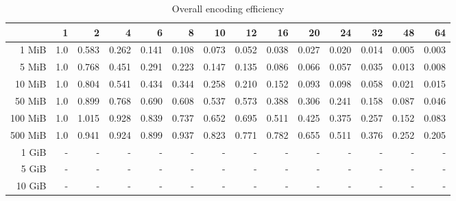 \begin{table}[!h]
	\centering
	\caption{Overall encoding efficiency}
	\begin{tabular}{rrrrrrrrrrrrrr}
		\toprule
		\diagbox[width=7em]{Size}{Processes} & 1 & 2 & 4 & 6 & 8 & 10 & 12 & 16 & 20 & 24 & 32 & 48 & 64 \\
        \midrule
        1 MiB   &  1.0 &  0.583 &  0.262 &  0.141 &  0.108 &  0.073 &  0.052 &  0.038 &  0.027 &  0.020 &  0.014 &  0.005 &  0.003 \\
        5 MiB   &  1.0 &  0.768 &  0.451 &  0.291 &  0.223 &  0.147 &  0.135 &  0.086 &  0.066 &  0.057 &  0.035 &  0.013 &  0.008 \\
        10 MiB  &  1.0 &  0.804 &  0.541 &  0.434 &  0.344 &  0.258 &  0.210 &  0.152 &  0.093 &  0.098 &  0.058 &  0.021 &  0.015 \\
        50 MiB  &  1.0 &  0.899 &  0.768 &  0.690 &  0.608 &  0.537 &  0.573 &  0.388 &  0.306 &  0.241 &  0.158 &  0.087 &  0.046 \\
        100 MiB &  1.0 &  1.015 &  0.928 &  0.839 &  0.737 &  0.652 &  0.695 &  0.511 &  0.425 &  0.375 &  0.257 &  0.152 &  0.083 \\
        500 MiB &  1.0 &  0.941 &  0.924 &  0.899 &  0.937 &  0.823 &  0.771 &  0.782 &  0.655 &  0.511 &  0.376 &  0.252 &  0.205 \\
        1 GiB & - & - & - & - & - & - & - & - & - & - & - & - & - \\
        5 GiB & - & - & - & - & - & - & - & - & - & - & - & - & - \\
        10 GiB & - & - & - & - & - & - & - & - & - & - & - & - & - \\
		\bottomrule
	\end{tabular}
\end{table}
